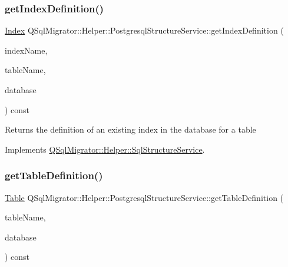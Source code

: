 \subsubsection{\texorpdfstring{get\+Index\+Definition()}{getIndexDefinition()}}
{\footnotesize\ttfamily \hyperlink{class_q_sql_migrator_1_1_structure_1_1_index}{Index} Q\+Sql\+Migrator\+::\+Helper\+::\+Postgresql\+Structure\+Service\+::get\+Index\+Definition (\begin{DoxyParamCaption}\item[{const Q\+String \&}]{index\+Name,  }\item[{const Q\+String \&}]{table\+Name,  }\item[{Q\+Sql\+Database}]{database }\end{DoxyParamCaption}) const\hspace{0.3cm}{\ttfamily [virtual]}}

\begin{DoxyReturn}{Returns}
the definition of an existing index in the database for a table 
\end{DoxyReturn}


Implements \hyperlink{class_q_sql_migrator_1_1_helper_1_1_sql_structure_service_ab62049f95710fc0965097f08b410e790}{Q\+Sql\+Migrator\+::\+Helper\+::\+Sql\+Structure\+Service}.

\mbox{\label{class_q_sql_migrator_1_1_helper_1_1_postgresql_structure_service_a6a6f23dd54be7f27f0fa798c65512746}} 
\subsubsection{\texorpdfstring{get\+Table\+Definition()}{getTableDefinition()}}
{\footnotesize\ttfamily \hyperlink{class_q_sql_migrator_1_1_structure_1_1_table}{Table} Q\+Sql\+Migrator\+::\+Helper\+::\+Postgresql\+Structure\+Service\+::get\+Table\+Definition (\begin{DoxyParamCaption}\item[{const Q\+String \&}]{table\+Name,  }\item[{Q\+Sql\+Database}]{database }\end{DoxyParamCaption}) const\hspace{0.3cm}{\ttfamily [virtual]}}

